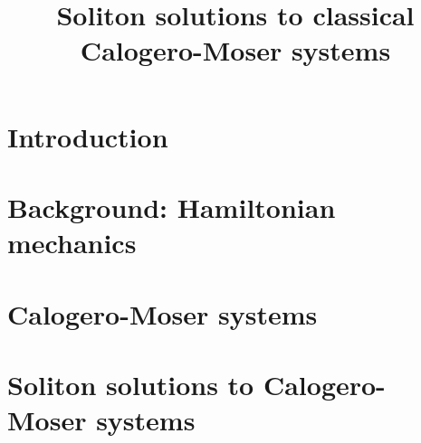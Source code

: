 \documentclass[12pt,twoside]{report}
\title{\textbf{Soliton solutions to classical Calogero-Moser systems}}
\author{}
\date{}
\newcommand\blankpage{%
    \null
    \thispagestyle{empty}%
    \addtocounter{page}{-1}%
    \newpage}
\begin{document}


\clearpage\pagestyle{empty}\null\newpage

\setcounter{page}{1}


\setcounter{page}{3}

\tableofcontents


\chapter*{Introduction}
\setcounter{page}{5}


\chapter{Background: Hamiltonian mechanics}\label{ch:hamiltonian}
\setcounter{page}{1}
\pagestyle{fancy}


\chapter{Calogero-Moser systems}\label{ch:cm}


\chapter{Soliton solutions to Calogero-Moser systems}\label{ch:solitons}


%

\renewcommand{\bibname}{References}
\cleardoublepage{}
{}

\nocite{*}


\end{document}
